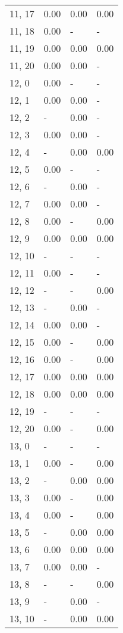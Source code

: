 \begin{table}
\begin{tabular}{llll}
11, 17 &  0.00 &  0.00 &  0.00 \\
11, 18 &  0.00 &     - &     - \\
11, 19 &  0.00 &  0.00 &  0.00 \\
11, 20 &  0.00 &  0.00 &     - \\
12, 0  &  0.00 &     - &     - \\
12, 1  &  0.00 &  0.00 &     - \\
12, 2  &     - &  0.00 &     - \\
12, 3  &  0.00 &  0.00 &     - \\
12, 4  &     - &  0.00 &  0.00 \\
12, 5  &  0.00 &     - &     - \\
12, 6  &     - &  0.00 &     - \\
12, 7  &  0.00 &  0.00 &     - \\
12, 8  &  0.00 &     - &  0.00 \\
12, 9  &  0.00 &  0.00 &  0.00 \\
12, 10 &     - &     - &     - \\
12, 11 &  0.00 &     - &     - \\
12, 12 &     - &     - &  0.00 \\
12, 13 &     - &  0.00 &     - \\
12, 14 &  0.00 &  0.00 &     - \\
12, 15 &  0.00 &     - &  0.00 \\
12, 16 &  0.00 &     - &  0.00 \\
12, 17 &  0.00 &  0.00 &  0.00 \\
12, 18 &  0.00 &  0.00 &  0.00 \\
12, 19 &     - &     - &     - \\
12, 20 &  0.00 &     - &  0.00 \\
13, 0  &     - &     - &     - \\
13, 1  &  0.00 &     - &  0.00 \\
13, 2  &     - &  0.00 &  0.00 \\
13, 3  &  0.00 &     - &  0.00 \\
13, 4  &  0.00 &     - &  0.00 \\
13, 5  &     - &  0.00 &  0.00 \\
13, 6  &  0.00 &  0.00 &  0.00 \\
13, 7  &  0.00 &  0.00 &     - \\
13, 8  &     - &     - &  0.00 \\
13, 9  &     - &  0.00 &     - \\
13, 10 &     - &  0.00 &  0.00 \\

\end{tabular}
\end{table}
